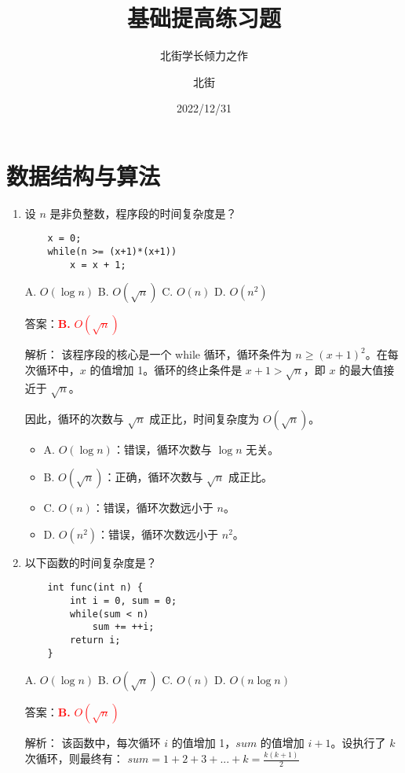 \documentclass[lang=cn,newtx,10pt,scheme=chinese]{../../../elegantbook}
\title{基础提高练习题}
\subtitle{北街学长倾力之作}
\author{北街}
\date{2022/12/31}
\begin{document}
\maketitle
\frontmatter

\tableofcontents

\mainmatter

\chapter{数据结构与算法}
\begin{enumerate}
    \item 设 $n$ 是非负整数，程序段的时间复杂度是？
    \begin{verbatim}
    x = 0;
    while(n >= (x+1)*(x+1))
        x = x + 1;
    \end{verbatim}
    A. $O(\log n)$ \quad B. $O(\sqrt{n})$ \quad C. $O(n)$ \quad D. $O(n^2)$

    答案：\textcolor{red}{\textbf{B.} $O(\sqrt{n})$}

    解析：
    该程序段的核心是一个 while 循环，循环条件为 $n \geq (x+1)^2$。在每次循环中，$x$ 的值增加 1。循环的终止条件是 $x+1 > \sqrt{n}$，即 $x$ 的最大值接近于 $\sqrt{n}$。

    因此，循环的次数与 $\sqrt{n}$ 成正比，时间复杂度为 $O(\sqrt{n})$。

    \begin{itemize}
        \item A. $O(\log n)$：错误，循环次数与 $\log n$ 无关。
        \item B. $O(\sqrt{n})$：正确，循环次数与 $\sqrt{n}$ 成正比。
        \item C. $O(n)$：错误，循环次数远小于 $n$。
        \item D. $O(n^2)$：错误，循环次数远小于 $n^2$。
    \end{itemize}
    
    \item 以下函数的时间复杂度是？
    \begin{verbatim}
    int func(int n) {
        int i = 0, sum = 0;
        while(sum < n)
            sum += ++i;
        return i;
    }
    \end{verbatim}
    A. $O(\log n)$ \quad B. $O(\sqrt{n})$ \quad C. $O(n)$ \quad D. $O(n\log n)$

    答案：\textcolor{red}{\textbf{B.} $O(\sqrt{n})$}

    解析：
    该函数中，每次循环 $i$ 的值增加 1，$sum$ 的值增加 $i+1$。设执行了 $k$ 次循环，则最终有：
    $sum = 1 + 2 + 3 + ... + k = \frac{k(k+1)}{2}$
    

\end{enumerate}
\end{document}
